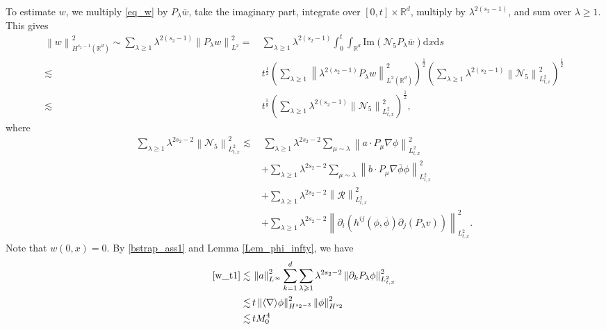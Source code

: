 \documentclass[10pt,twoside,a4paper]{article}
\numberwithin{equation}{section}\allowdisplaybreaks
\def\geq{\geqslant}
\begin{document}
	To estimate $w$, we multiply \eqref{eq_w} by $P_{\lambda} \overline{w}$, take the imaginary part, integrate over $[0,t] \times \mathbb{R}^d$, multiply by $\lambda^{2(s_2-1)}$, and sum over $\lambda \geq 1$. This gives
	\begin{align}
		\left\| w\right\|^2_{H^{s_2-1}(\mathbb{R}^d)}\sim   \sum_{\lambda \geq 1} \lambda^{2 (s_2-1)}	\left\|	 P_{\lambda }  w\right\|_{L^2}^2 = &  \,\sum_{\lambda \geq 1} \lambda^{2(s_2-1)}\int_0^t \int_{\mathbb{R}^{d}}  \mathrm{Im} (\mathcal{N}_5P_{\lambda }  \overline{w} ) \mathrm{d} x\mathrm{d} s \nonumber\\
		\lesssim &\, t^{\frac 12} \left(\sum_{\lambda \geq 1} \left\|\lambda^{ 2 (s_2-1)}P_{\lambda }  w\right\|_{L^2(\mathbb{R}^d)}^2 \right )^{\frac 12} \left(\sum_{\lambda \geq 1} \lambda^{ 2 (s_2-1)}\left\|\mathcal{N}_5\right\|_{L^2_{t,x}}^2\right)^{\frac12 }\nonumber\\
		\lesssim &\, t^{\frac 58}
		\left(\sum_{\lambda \geq 1} \lambda^{ 2 (s_2-1)}\left\|\mathcal{N}_5\right\|_{L^2_{t,x}}^2\right)^{\frac12 }\nonumber,
	\end{align}
	where
	\begin{align}
		\sum_{\lambda \geq 1} \lambda^{ 2s_2-2}\left\|\mathcal{N}_5\right\|_{L^2_{t,x}}^2
		\lesssim &\,  \sum_{\lambda \geq 1} \lambda^{ 2 s_2-2}\sum_{\mu\sim \lambda}
		\left\|a \cdot    P_\mu \nabla \phi\right\|_{L^2_{t,x}}\label{w_t1}^2 \\
		&+ \sum_{\lambda \geq 1} \lambda^{ 2s_2-2} \sum_{\mu\sim \lambda}
		\left\| b\cdot     P_\mu \nabla\overline{ \phi }\phi\right\|_{L^2_{t,x}}^2\label{w_t2}\\
		&+ \sum_{\lambda \geq 1} \lambda^{ 2s_2-2}
		\left\|\mathcal{R}\right\|_{L^2_{t,x}}^2\label{w_t3}\\
		&+ \sum_{\lambda \geq 1} \lambda^{ 2s_2-2}
		\left\|\partial_i\left( h^{ij}\left(\phi,\overline{\phi}\right)   \partial_j  (P_{\lambda }  v)\right)\right\|_{L^2_{t,x}}^2. \label{w_t4}
	\end{align}
	Note that $ w(0,x)=0. $
	By \eqref{bstrap_ass1} and Lemma \ref{Lem_phi_infty}, we have
	\begin{align*}
		\eqref{w_t1}\lesssim &\, \left\|  a\right\|_{L^\infty}^2  \sum_{k=1}^d  \sum_{\lambda \geq 1} \lambda^{ 2s_2-2}  \left\| \partial_k  P_{\lambda } \phi   \right\|_{L^2_{t,x}}^2 \\
		\lesssim &\,  t \left\|  \langle \nabla \rangle  \phi \right\|_{H^{s_2-3}}^2   \left\|  \phi \right\|_{H^ {s_2}}^2 \\
		\lesssim &\,   t M_0^4
	\end{align*}
\end{document}
